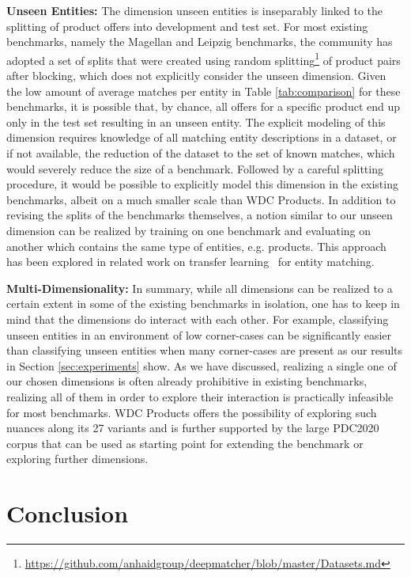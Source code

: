 \documentclass[sigconf,edbt]{acmart-edbt2024}
\begin{document}
\textbf{Unseen Entities:} The dimension unseen entities is inseparably linked to the splitting of product offers into development and test set. For most existing benchmarks, namely the Magellan and Leipzig benchmarks, the community has adopted a set of splits that were created using random splitting\footnote{\url{https://github.com/anhaidgroup/deepmatcher/blob/master/Datasets.md}} of product pairs after blocking, which does not explicitly consider the unseen dimension. Given the low amount of average matches per entity in Table \ref{tab:comparison} for these benchmarks, it is possible that, by chance, all offers for a specific product end up only in the test set resulting in an unseen entity. The explicit modeling of this dimension requires knowledge of all matching entity descriptions in a dataset, or if not available, the reduction of the dataset to the set of known matches, which would severely reduce the size of a benchmark. Followed by a careful splitting procedure, it would be possible to explicitly model this dimension in the existing benchmarks, albeit on a much smaller scale than WDC Products. In addition to revising the splits of the benchmarks themselves, a notion similar to our unseen dimension can be realized by training on one benchmark and evaluating on another which contains the same type of entities, e.g. products. This approach has been explored in related work on transfer learning~\cite{trabelsiDAMEDomainAdaptation2022,tuDomainAdaptationDeep2022,akbarianrastaghiProbingRobustnessPretrained2022} for entity matching.



\textbf{Multi-Dimensionality:} In summary, while all dimensions can be realized to a certain extent in some of the existing benchmarks in isolation, one has to keep in mind that the dimensions do interact with each other. For example, classifying unseen entities in an environment of low corner-cases can be significantly easier than classifying unseen entities when many corner-cases are present as our results in Section \ref{sec:experiments} show. As we have discussed, realizing a single one of our chosen dimensions is often already prohibitive in existing benchmarks, realizing all of them in order to explore their interaction is practically infeasible for most benchmarks. WDC Products offers the possibility of exploring such nuances along its 27 variants and is further supported by the large PDC2020 corpus that can be used as starting point for extending the benchmark or exploring further dimensions. \section{Conclusion}
\label{sec:conclusion}
\end{document}
